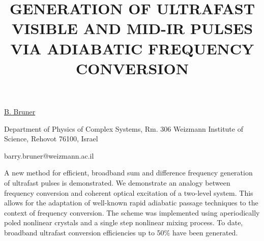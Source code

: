 \title{GENERATION OF ULTRAFAST VISIBLE AND MID-IR PULSES VIA ADIABATIC FREQUENCY CONVERSION}

\underline{B. Bruner} 

{\normalsize{\vspace{-4mm}
Department of Physics of Complex Systems, Rm. 306 Weizmann Institute
of Science, Rehovot 76100, Israel

\email barry.bruner@weizmann.ac.il}}

A new method for efficient, broadband sum and difference frequency generation of ultrafast pulses is demonstrated. We demonstrate an analogy between frequency conversion and coherent optical excitation of a two-level system.  This allows for the adaptation of well-known rapid adiabatic passage techniques to the context of frequency conversion. The scheme was implemented using aperiodically poled nonlinear crystals and a single step nonlinear mixing process. To date, broadband ultrafast conversion efficiencies up to 50\% have been generated.

\vspace{\baselineskip} 